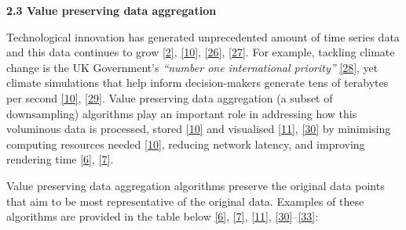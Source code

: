 \documentclass{article}
\begin{document}
\textbf{2.3 Value preserving data aggregation}

Technological innovation has generated unprecedented amount of time
series data and this data continues to grow
\protect\hyperlink{ref-data2020}{{[}2{]}},
\protect\hyperlink{ref-TVStore}{{[}10{]}},
\protect\hyperlink{ref-storage}{{[}26{]}},
\protect\hyperlink{ref-CatchUp}{{[}27{]}}. For example, tackling climate
change is the UK Government's \emph{``number one international
priority''} \protect\hyperlink{ref-IR}{{[}28{]}}, yet climate
simulations that help inform decision-makers generate tens of terabytes
per second \protect\hyperlink{ref-TVStore}{{[}10{]}},
\protect\hyperlink{ref-climate}{{[}29{]}}. Value preserving data
aggregation (a subset of downsampling) algorithms play an important role
in addressing how this voluminous data is processed, stored
\protect\hyperlink{ref-TVStore}{{[}10{]}} and visualised
\protect\hyperlink{ref-Sveinn}{{[}11{]}},
\protect\hyperlink{ref-dashql}{{[}30{]}} by minimising computing
resources needed \protect\hyperlink{ref-TVStore}{{[}10{]}}, reducing
network latency, and improving rendering time
\protect\hyperlink{ref-datapoint}{{[}6{]}},
\protect\hyperlink{ref-MinMaxLTTB}{{[}7{]}}.

Value preserving data aggregation algorithms preserve the original data
points that aim to be most representative of the original data. Examples
of these algorithms are provided in the table below
\protect\hyperlink{ref-datapoint}{{[}6{]}},
\protect\hyperlink{ref-MinMaxLTTB}{{[}7{]}},
\protect\hyperlink{ref-Sveinn}{{[}11{]}},
\protect\hyperlink{ref-dashql}{{[}30{]}}--\protect\hyperlink{ref-M4}{{[}33{]}}:

\renewcommand{\arraystretch}{1.5}
\end{document}
